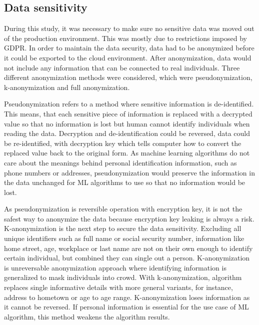 
\subsection{Data sensitivity}\label{subsec:bg-data-sensitivity}

During this study,
it was necessary to make sure no sensitive data
was moved out of the production environment.
This was mostly due to restrictions imposed by GDPR\@.
In order to maintain the data security,
data had to be anonymized
before it could be exported to the cloud environment.
After anonymization,
data would not include any information
that can be connected to real individuals.
Three different anonymization methods were considered,
which were pseudonymization, k-anonymization and full anonymization.

Pseudonymization refers to a method
where sensitive information is de-identified.
This means,
that each sensitive piece of information
is replaced with a decrypted value
so that no information is lost
but human cannot identify individuals
when reading the data.
Decryption and de-identification
could be reversed, \ie data could be re-identified,
with decryption key which tells computer
how to convert the replaced value back to the original form.
As machine learning algorithms do not care about the meanings
behind personal identification information,
such as phone numbers or addresses,
pseudonymization would preserve the information in the data unchanged
for ML algorithms to use so that no information would be lost.~\cite{noumeir2007pseudonymization}

As pseudonymization is reversible operation with encryption key,
it is not the safest way to anonymize the data
because encryption key leaking is always a risk.
K-anonymization is the next step to secure the data sensitivity.
Excluding all unique identifiers such as full name or social security number,
information like home street, age, workplace or last name
are not on their own enough to identify certain individual,
but combined they can single out a person.
K-anonymization is unreversable anonymization approach
where identifying information is generalized
to mask individuals into crowd.
With k-anonymization,
algorithm replaces single informative details
with more general variants,
for instance,
address to hometown or age to age range.
K-anonymization loses information
as it cannot be reversed.
If personal information is essential for the use case of ML algorithm,
this method weakens the algorithm results.~\cite{byun2007efficient}

